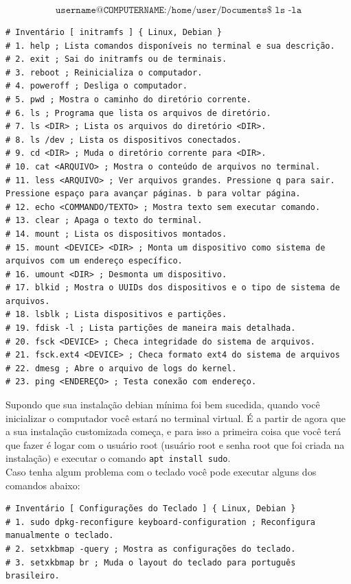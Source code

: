 \documentclass[12pt,a4paper]{article}
\begin{document}
$$ \texttt{username@COMPUTERNAME:/home/user/Documents}\$ \texttt{ ls -la} $$

\begin{lstlisting}
# Inventário [ initramfs ] { Linux, Debian }
# 1. help ; Lista comandos disponíveis no terminal e sua descrição.
# 2. exit ; Sai do initramfs ou de terminais.
# 3. reboot ; Reinicializa o computador.
# 4. poweroff ; Desliga o computador.
# 5. pwd ; Mostra o caminho do diretório corrente. 
# 6. ls ; Programa que lista os arquivos de diretório. 
# 7. ls <DIR> ; Lista os arquivos do diretório <DIR>. 
# 8. ls /dev ; Lista os dispositivos conectados.
# 9. cd <DIR> ; Muda o diretório corrente para <DIR>.
# 10. cat <ARQUIVO> ; Mostra o conteúdo de arquivos no terminal.
# 11. less <ARQUIVO> ; Ver arquivos grandes. Pressione q para sair. Pressione espaço para avançar páginas. b para voltar página.
# 12. echo <COMMANDO/TEXTO> ; Mostra texto sem executar comando.
# 13. clear ; Apaga o texto do terminal.
# 14. mount ; Lista os dispositivos montados. 
# 15. mount <DEVICE> <DIR> ; Monta um dispositivo como sistema de arquivos com um endereço específico.
# 16. umount <DIR> ; Desmonta um dispositivo.
# 17. blkid ; Mostra o UUIDs dos dispositivos e o tipo de sistema de arquivos. 
# 18. lsblk ; Lista dispositivos e partições.
# 19. fdisk -l ; Lista partições de maneira mais detalhada.
# 20. fsck <DEVICE> ; Checa integridade do sistema de arquivos.
# 21. fsck.ext4 <DEVICE> ; Checa formato ext4 do sistema de arquivos
# 22. dmesg ; Abre o arquivo de logs do kernel.
# 23. ping <ENDEREÇO> ; Testa conexão com endereço. 
\end{lstlisting}

\vspace{\baselineskip}

Supondo que sua instalação debian mínima foi bem sucedida, quando você inicializar o computador você estará no terminal virtual. É a partir de agora que a sua instalação customizada começa, e para isso a primeira coisa que você terá que fazer é logar com o usuário root (usuário root e senha root que foi criada na instalação) e executar o comando \texttt{apt install sudo}. \\

Caso tenha algum problema com o teclado você pode executar alguns dos comandos abaixo: \\

\begin{lstlisting}
# Inventário [ Configurações do Teclado ] { Linux, Debian }
# 1. sudo dpkg-reconfigure keyboard-configuration ; Reconfigura manualmente o teclado.
# 2. setxkbmap -query ; Mostra as configurações do teclado.
# 3. setxkbmap br ; Muda o layout do teclado para português brasileiro.
\end{lstlisting}
\end{document}
